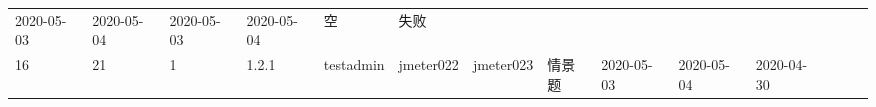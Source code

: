 \documentclass[hyperref, a4paper]{ctexart}
\begin{document}
\begin{longtable}[]{@{}llllllllllllll@{}}
\begin{minipage}[t]{0.04\columnwidth}
2020-05-03\strut
\end{minipage} & \begin{minipage}[t]{0.05\columnwidth}\raggedright
2020-05-04\strut
\end{minipage} & \begin{minipage}[t]{0.07\columnwidth}\raggedright
2020-05-03\strut
\end{minipage} & \begin{minipage}[t]{0.08\columnwidth}\raggedright
2020-05-04\strut
\end{minipage} & \begin{minipage}[t]{0.04\columnwidth}\raggedright
空\strut
\end{minipage} & \begin{minipage}[t]{0.02\columnwidth}\raggedright
失败\strut
\end{minipage}\tabularnewline
\begin{minipage}[t]{0.01\columnwidth}\raggedright
16\strut
\end{minipage} & \begin{minipage}[t]{0.12\columnwidth}\raggedright
21\strut
\end{minipage} & \begin{minipage}[t]{0.03\columnwidth}\raggedright
1\strut
\end{minipage} & \begin{minipage}[t]{0.06\columnwidth}\raggedright
1.2.1\strut
\end{minipage} & \begin{minipage}[t]{0.04\columnwidth}\raggedright
testadmin\strut
\end{minipage} & \begin{minipage}[t]{0.04\columnwidth}\raggedright
jmeter022\strut
\end{minipage} & \begin{minipage}[t]{0.04\columnwidth}\raggedright
jmeter023\strut
\end{minipage} & \begin{minipage}[t]{0.02\columnwidth}\raggedright
情景题\strut
\end{minipage} & \begin{minipage}[t]{0.04\columnwidth}\raggedright
2020-05-03\strut
\end{minipage} & \begin{minipage}[t]{0.05\columnwidth}\raggedright
2020-05-04\strut
\end{minipage} & \begin{minipage}[t]{0.07\columnwidth}\raggedright
2020-04-30\strut

\end{minipage}
\end{longtable}
\end{document}
